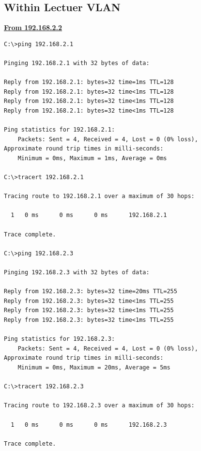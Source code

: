\documentclass{article}
\begin{document}
\subsection{Within Lectuer VLAN}
\textbf{\underline{From 192.168.2.2}}\\
\begin{lstlisting}[language=CISCO]
C:\>ping 192.168.2.1

Pinging 192.168.2.1 with 32 bytes of data:

Reply from 192.168.2.1: bytes=32 time=1ms TTL=128
Reply from 192.168.2.1: bytes=32 time<1ms TTL=128
Reply from 192.168.2.1: bytes=32 time<1ms TTL=128
Reply from 192.168.2.1: bytes=32 time<1ms TTL=128

Ping statistics for 192.168.2.1:
    Packets: Sent = 4, Received = 4, Lost = 0 (0% loss),
Approximate round trip times in milli-seconds:
    Minimum = 0ms, Maximum = 1ms, Average = 0ms

C:\>tracert 192.168.2.1

Tracing route to 192.168.2.1 over a maximum of 30 hops: 

  1   0 ms      0 ms      0 ms      192.168.2.1

Trace complete.

C:\>ping 192.168.2.3

Pinging 192.168.2.3 with 32 bytes of data:

Reply from 192.168.2.3: bytes=32 time=20ms TTL=255
Reply from 192.168.2.3: bytes=32 time<1ms TTL=255
Reply from 192.168.2.3: bytes=32 time<1ms TTL=255
Reply from 192.168.2.3: bytes=32 time<1ms TTL=255

Ping statistics for 192.168.2.3:
    Packets: Sent = 4, Received = 4, Lost = 0 (0% loss),
Approximate round trip times in milli-seconds:
    Minimum = 0ms, Maximum = 20ms, Average = 5ms

C:\>tracert 192.168.2.3

Tracing route to 192.168.2.3 over a maximum of 30 hops: 

  1   0 ms      0 ms      0 ms      192.168.2.3

Trace complete.
\end{lstlisting}
\end{document}
